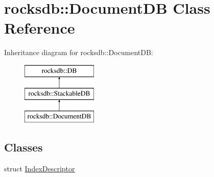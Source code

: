 \hypertarget{classrocksdb_1_1DocumentDB}{}\section{rocksdb\+:\+:Document\+DB Class Reference}
\label{classrocksdb_1_1DocumentDB}
Inheritance diagram for rocksdb\+:\+:Document\+DB\+:\begin{figure}[H]
\begin{center}
\leavevmode
\includegraphics[height=3.000000cm]{classrocksdb_1_1DocumentDB}
\end{center}
\end{figure}
\subsection*{Classes}
\begin{DoxyCompactItemize}
\item 
struct \hyperlink{structrocksdb_1_1DocumentDB_1_1IndexDescriptor}{Index\+Descriptor}
\end{DoxyCompactItemize}
